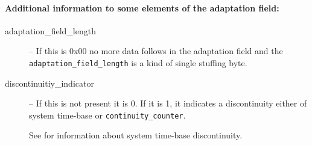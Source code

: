 \documentclass{scrartcl}
\begin{document}
\paragraph{Additional information to some elements of the adaptation field:}
\begin{description}
\item[adaptation\_field\_length] -- If this is 0x00 no more data follows in
  the adaptation field and the \texttt{adaptation\_field\_length} is a kind of
  single stuffing byte.
\item[discontinuitiy\_indicator] -- If this is not present it is 0. If it is
  1, it indicates a discontinuity either of system time-base or
  \texttt{continuity\_counter}.

  See \cite[section~2.4.3.5]{iso13818-1} for information about system
  time-base discontinuity.


\end{description}
\end{document}
